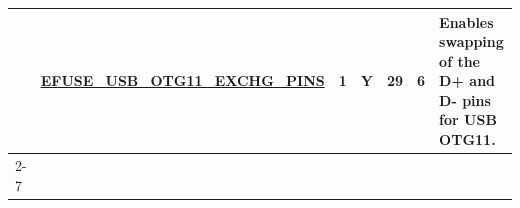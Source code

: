 \begin{longtable}[l]{ |l|c|c|c|r|r|p{6cm}| }
    & \hyperref[fielddesc:EFUSEUSBOTG11EXCHGPINS]{EFUSE\_USB\_OTG11\_EXCHG\_PINS} & 1 & Y & 29 & 6 & Enables swapping of the D+ and D- pins for USB OTG11. \\\cline{2-7}
\hline
\end{longtable}
